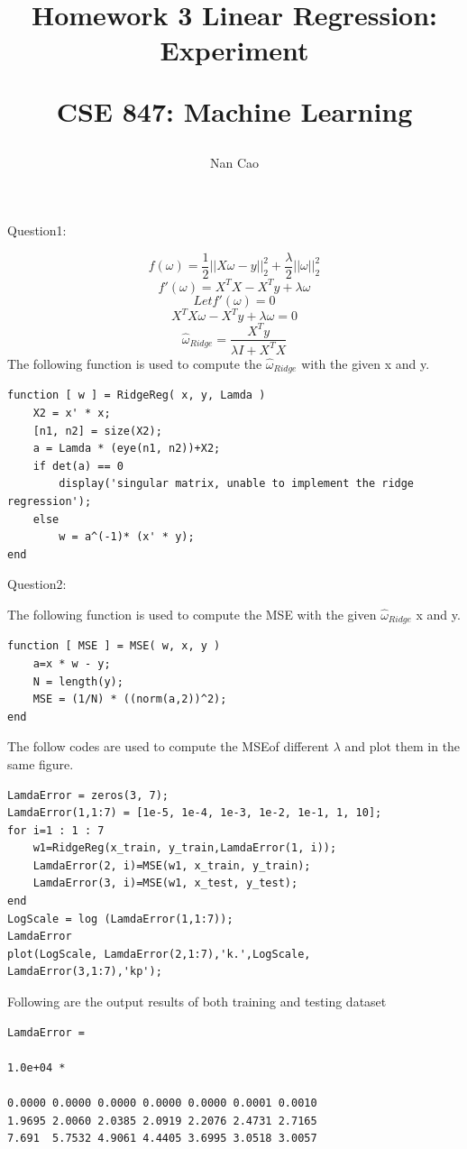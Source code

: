 \documentclass{sig-alternate}
\begin{document}
\title{Homework 3 Linear Regression: Experiment \\\begin{it} CSE 847: Machine Learning	\end{it}}
\author{Nan Cao}
\maketitle
\begin{bf} Question1:\end{bf}
$$f(\omega)=\frac{1}{2}{||X\omega-y||}_2^2+\frac{\lambda}{2}{||\omega||}_2^2$$
$$f'(\omega)=X^TX-X^Ty+\lambda\omega$$
$$Let f'(\omega)=0$$
$$X^TX\omega-X^Ty+\lambda\omega=0$$
$${\hat{\omega}}_{Ridge}=\frac{X^Ty}{\lambda I+X^TX}$$  
The following function is used to compute the ${\hat{\omega}}_{Ridge}$ with the given x and y.
\begin{lstlisting}
function [ w ] = RidgeReg( x, y, Lamda )
	X2 = x' * x;
	[n1, n2] = size(X2);
	a = Lamda * (eye(n1, n2))+X2;
	if det(a) == 0
		display('singular matrix, unable to implement the ridge regression');
	else
		w = a^(-1)* (x' * y);
end
\end{lstlisting}  
\begin{bf} Question2:\end{bf}
The following function is used to compute the MSE with the given ${\hat{\omega}}_{Ridge}$ x and y.
\begin{lstlisting}
function [ MSE ] = MSE( w, x, y )
	a=x * w - y;
	N = length(y);
	MSE = (1/N) * ((norm(a,2))^2);
end
\end{lstlisting}
The follow codes are used to compute the MSEof different $\lambda$ and plot them in the same figure.
\begin{lstlisting}
LamdaError = zeros(3, 7);
LamdaError(1,1:7) = [1e-5, 1e-4, 1e-3, 1e-2, 1e-1, 1, 10];
for i=1 : 1 : 7
	w1=RidgeReg(x_train, y_train,LamdaError(1, i));
	LamdaError(2, i)=MSE(w1, x_train, y_train);
	LamdaError(3, i)=MSE(w1, x_test, y_test);
end
LogScale = log (LamdaError(1,1:7));
LamdaError
plot(LogScale, LamdaError(2,1:7),'k.',LogScale, LamdaError(3,1:7),'kp');
\end{lstlisting}
Following are the output results of both training and testing dataset
\begin{verbatim}
LamdaError =

1.0e+04 *

0.0000 0.0000 0.0000 0.0000 0.0000 0.0001 0.0010
1.9695 2.0060 2.0385 2.0919 2.2076 2.4731 2.7165
7.691  5.7532 4.9061 4.4405 3.6995 3.0518 3.0057
\end{verbatim}
\end{document}
